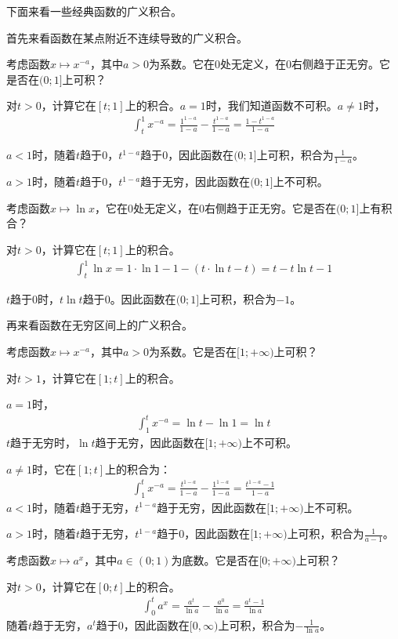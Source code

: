 \documentclass[12pt,UTF8,fontset=none]{ctexbook}
\begin{document}
下面来看一些经典函数的广义积合。

首先来看函数在某点附近不连续导致的广义积合。

考虑函数$x\mapsto x^{-a}$，其中$a>0$为系数。它在$0$处无定义，在$0$右侧趋于正无穷。它是否在$(0;1]$上可积？

对$t>0$，计算它在$[t;1]$上的积合。$a=1$时，我们知道函数不可积。$a\neq 1$时，
\begin{align*}
    \int_t^1 x^{-a} = \frac{1^{1-a}}{1 - a} - \frac{t^{1-a}}{1 - a} = \frac{1 - t^{1-a}}{1-a} 
\end{align*}

$a<1$时，随着$t$趋于$0$，$t^{1-a}$趋于$0$，因此函数在$(0;1]$上可积，积合为$\frac{1}{1-a}$。

$a>1$时，随着$t$趋于$0$，$t^{1-a}$趋于无穷，因此函数在$(0;1]$上不可积。

考虑函数$x\mapsto \ln{x}$，它在$0$处无定义，在$0$右侧趋于正无穷。它是否在$(0;1]$上有积合？

对$t>0$，计算它在$[t;1]$上的积合。
\begin{align*}
    \int_t^1 \ln{x} = 1\cdot \ln{1} - 1 - (t\cdot\ln{t} - t)= t - t\ln{t} - 1
\end{align*}

$t$趋于$0$时，$t\ln{t}$趋于$0$。因此函数在$(0;1]$上可积，积合为$-1$。

再来看函数在无穷区间上的广义积合。

考虑函数$x\mapsto x^{-a}$，其中$a>0$为系数。它是否在$[1;+\infty)$上可积？

对$t>1$，计算它在$[1;t]$上的积合。

$a=1$时，
\begin{align*}
    \int_1^t x^{-a} = \ln{t} - \ln{1} = \ln{t} 
\end{align*}
$t$趋于无穷时，$\ln{t}$趋于无穷，因此函数在$[1;+\infty)$上不可积。

$a\neq 1$时，它在$[1;t]$上的积合为：
\begin{align*}
    \int_1^t x^{-a} = \frac{t^{1-a}}{1 - a} - \frac{1^{1-a}}{1 - a} = \frac{t^{1-a} - 1}{1-a} 
\end{align*}
$a<1$时，随着$t$趋于无穷，$t^{1-a}$趋于无穷，因此函数在$[1;+\infty)$上不可积。

$a>1$时，随着$t$趋于无穷，$t^{1-a}$趋于$0$，因此函数在$[1;+\infty)$上可积，积合为$\frac{1}{a-1}$。

考虑函数$x\mapsto a^x$，其中$a\in(0;1)$为底数。它是否在$[0;+\infty)$上可积？

对$t>0$，计算它在$[0;t]$上的积合。
\begin{align*}
    \int_0^t a^x = \frac{a^t}{\ln{a}} - \frac{a^0}{\ln{a}} = \frac{a^t - 1}{\ln{a}}
\end{align*}
随着$t$趋于无穷，$a^t$趋于$0$，因此函数在$[0,\infty)$上可积，积合为$-\frac{1}{\ln{a}}$。
\end{document}
